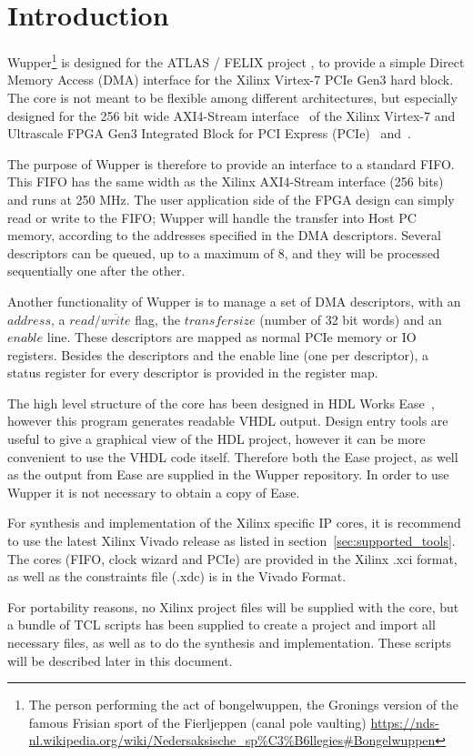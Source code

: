 \section{Introduction}
Wupper\footnote{The person performing the act of bongelwuppen, the Gronings version of the famous Frisian sport of the Fierljeppen (canal pole vaulting) \url{https://nds-nl.wikipedia.org/wiki/Nedersaksische_sp\%C3\%B6llegies\#Bongelwuppen}} is designed for the ATLAS / FELIX project \cite{felix}, to provide a simple
Direct Memory Access (DMA) interface for the Xilinx Virtex-7 PCIe Gen3 hard block. The core is not meant to be flexible among different architectures, but especially designed for the 256 bit wide AXI4-Stream interface~\cite{ug761}  of the Xilinx Virtex-7 and Ultrascale FPGA Gen3 Integrated Block for PCI Express (PCIe)~\cite{xilinxcore} and~\cite{pg023}.

The purpose of Wupper is therefore to provide an interface to a standard FIFO. This FIFO has the same width as the Xilinx AXI4-Stream interface (256 bits) and runs at 250 MHz. The user application side of the FPGA design can simply read or write to the FIFO; Wupper will handle the transfer into Host PC memory, according to the addresses specified in the DMA descriptors. Several descriptors can be queued, up to a maximum of 8, and they will be processed sequentially one after the other. 

Another functionality of Wupper is to manage a set of DMA descriptors, with an $address$, a $read/\overline{write}$ flag, the $transfer size$ (number of 32 bit words) and an $enable$ line. These descriptors are mapped as normal PCIe memory or IO registers. Besides the descriptors and the enable line (one per descriptor), a status register for every descriptor is provided in the register map.
 
The high level structure of the core has been designed in HDL Works Ease~\cite{ease}, however this program generates readable VHDL output. Design entry tools are useful to give a graphical view of the HDL project, however it can be more convenient to use the VHDL code itself. Therefore both the Ease project, as well as the output from Ease are supplied in the Wupper repository. In order to use Wupper it is not necessary to obtain a copy of Ease.

For synthesis and implementation of the Xilinx specific IP cores, it is recommend to use the latest Xilinx Vivado release as listed in section~\ref{sec:supported_tools}. The cores (FIFO, clock wizard and PCIe) are provided in the Xilinx .xci format, as well as the constraints file (.xdc) is in the Vivado Format.

For portability reasons, no Xilinx project files will be supplied with the core, but a bundle of TCL scripts has been supplied to create a project and import all necessary files, as well as to do the synthesis and implementation. These scripts will be described later in this document.


\newpage
